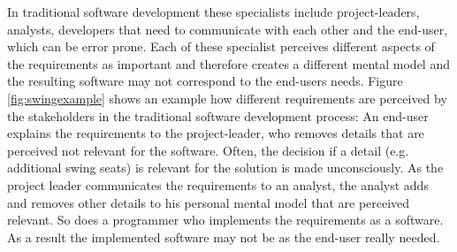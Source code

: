 \documentclass[runningheads,a4paper]{llncs}
\begin{document}
In traditional software development these specialists include project-leaders, analysts, developers that need 
to communicate with each other and the end-user, which can be error prone.
Each of these specialist perceives different aspects of the requirements as important and therefore creates a different mental model
and the resulting software may not correspond to the end-users needs. 
Figure \ref{fig:swingexample} shows an example how different requirements are perceived by the stakeholders in the traditional software development process:
An end-user explains the requirements to the project-leader, who removes details that are perceived not relevant for the software.
Often, the decision if a detail (e.g. additional swing seats) is relevant for the solution is made unconsciously. 
As the project leader communicates the requirements to an analyst, the analyst adds and removes other details 
to his personal mental model that are perceived relevant. So does a programmer who implements the requirements as a software.
As a result the implemented software may not be as the end-user really needed.
\end{document}
